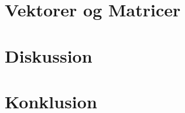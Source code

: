 \documentclass{article}
\begin{document}

\tableofcontents
\newpage


\newpage




\newpage
\section{Vektorer og Matricer}




\section{Diskussion}
\section{Konklusion}
\newpage
\printbibliography

\newpage

\end{document}
